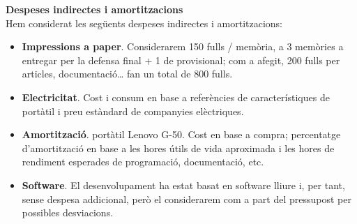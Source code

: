 \noindent \textbf{\large Despeses indirectes i amortitzacions}\\

\noindent Hem considerat les següents despeses indirectes i amortitzacions:

\begin{itemize}
\item \textbf{Impressions a paper}. Considerarem 150 fulls / memòria, a 3 memòries a entregar per la defensa final + 1 de provisional; com a afegit, 200 fulls per articles, documentació… fan un total de 800 fulls.
\item \textbf{Electricitat}. Cost i consum en base a referències de característiques de portàtil i preu estàndard de companyies elèctriques.
\item \textbf{Amortització}. portàtil Lenovo G-50. Cost en base a compra; percentatge d’amortització en base a les hores útils de vida aproximada i les hores de rendiment esperades de programació, documentació, etc.
\item \textbf{Software}. El desenvolupament ha estat basat en software lliure i, per tant, sense despesa addicional, però el considerarem com a part del pressupost per possibles desviacions.
\end{itemize}

\begin{table}[htb]
\centering
\label{PressupostIndirectes}
\caption{Costos indirectes i amortitzacions}
\end{table}


